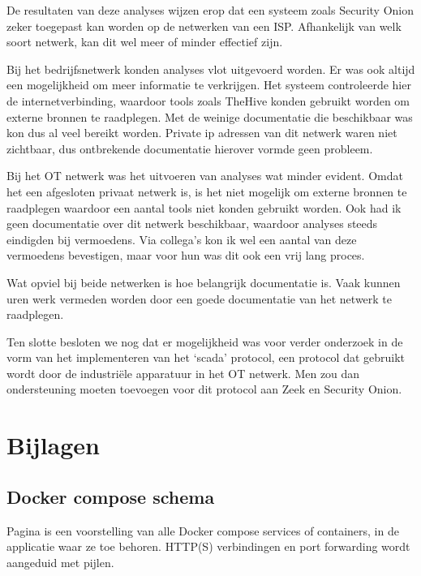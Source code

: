 \documentclass[a4paper,12pt]{report}
\begin{document}
De resultaten van deze analyses wijzen erop dat een systeem zoals Security Onion zeker toegepast kan worden op de netwerken van een ISP.
Afhankelijk van welk soort netwerk, kan dit wel meer of minder effectief zijn.

Bij het bedrijfsnetwerk konden analyses vlot uitgevoerd worden.
Er was ook altijd een mogelijkheid om meer informatie te verkrijgen.
Het systeem controleerde hier de internetverbinding, waardoor tools zoals TheHive konden gebruikt worden om externe bronnen te raadplegen.
Met de weinige documentatie die beschikbaar was kon dus al veel bereikt worden.
Private ip adressen van dit netwerk waren niet zichtbaar, dus ontbrekende documentatie hierover vormde geen probleem.

Bij het OT netwerk was het uitvoeren van analyses wat minder evident.
Omdat het een afgesloten privaat netwerk is, is het niet mogelijk om externe bronnen te raadplegen waardoor een aantal tools niet konden gebruikt worden.
Ook had ik geen documentatie over dit netwerk beschikbaar, waardoor analyses steeds eindigden bij vermoedens.
Via collega's kon ik wel een aantal van deze vermoedens bevestigen, maar voor hun was dit ook een vrij lang proces.

Wat opviel bij beide netwerken is hoe belangrijk documentatie is.
Vaak kunnen uren werk vermeden worden door een goede documentatie van het netwerk te raadplegen.

Ten slotte besloten we nog dat er mogelijkheid was voor verder onderzoek in de vorm van het implementeren van het `scada' protocol, een protocol dat gebruikt wordt door de industriële apparatuur in het OT netwerk.
Men zou dan ondersteuning moeten toevoegen voor dit protocol aan Zeek en Security Onion.

\chapter*{Bijlagen}

\section*{Docker compose schema}
Pagina \pageref{bijlage:aangepast-systeem-schema-docker} is een voorstelling van alle Docker compose services of containers, in de applicatie waar ze toe behoren.
HTTP(S) verbindingen en port forwarding wordt aangeduid met pijlen.



\printbibliography
{}

\newpage
\thispagestyle{empty}
\mbox{}

\newpage
\thispagestyle{empty}
\mbox{}
\end{document}
